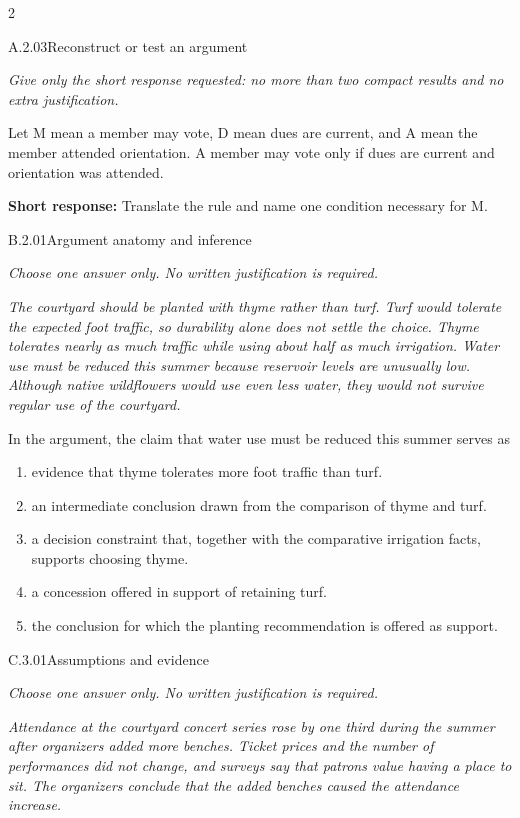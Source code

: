 \documentclass[9pt]{extarticle}
\newcommand{\choice}[1]{\item #1}
\begin{document}
\begin{multicols}{2}
\begin{DenseCoreProblem}{A.2.03}{Reconstruct or test an argument}
{\scriptsize\textit{Give only the short response requested: no more than two compact results and no extra justification.}\par}
Let M mean a member may vote, D mean dues are current, and A mean the member attended orientation. A member may vote only if dues are current and orientation was attended.

\textbf{Short response:} Translate the rule and name one condition necessary for M.
\end{DenseCoreProblem}
\begin{DenseCoreProblem}{B.2.01}{Argument anatomy and inference}
{\scriptsize\textit{Choose one answer only. No written justification is required.}\par}
\emph{The courtyard should be planted with thyme rather than turf. Turf would tolerate the expected foot traffic, so durability alone does not settle the choice. Thyme tolerates nearly as much traffic while using about half as much irrigation. Water use must be reduced this summer because reservoir levels are unusually low. Although native wildflowers would use even less water, they would not survive regular use of the courtyard.}

In the argument, the claim that water use must be reduced this summer serves as
\begin{enumerate}[label=(\alph*)]
  \choice{evidence that thyme tolerates more foot traffic than turf.}
  \choice{an intermediate conclusion drawn from the comparison of thyme and turf.}
  \choice{a decision constraint that, together with the comparative irrigation facts, supports choosing thyme.}
  \choice{a concession offered in support of retaining turf.}
  \choice{the conclusion for which the planting recommendation is offered as support.}
\end{enumerate}
\end{DenseCoreProblem}
\columnbreak
\begin{DenseCoreProblem}{C.3.01}{Assumptions and evidence}
{\scriptsize\textit{Choose one answer only. No written justification is required.}\par}
\emph{Attendance at the courtyard concert series rose by one third during the summer after organizers added more benches. Ticket prices and the number of performances did not change, and surveys say that patrons value having a place to sit. The organizers conclude that the added benches caused the attendance increase.}


\end{DenseCoreProblem}
\end{multicols}
\end{document}
